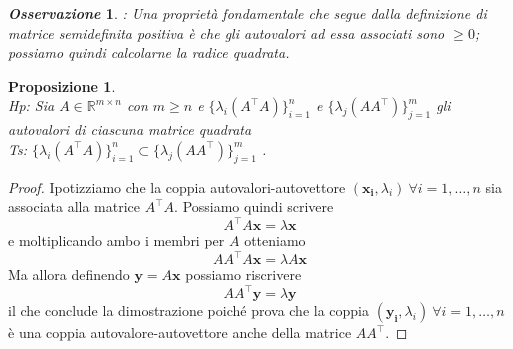 \documentclass[11pt]{article}
\newtheorem{proposition}{Proposizione}
\newtheorem{oss}{\textit{Osservazione}}
\newcommand{\R}{\mathbb{R}}
\begin{document}
\noindent
\begin{oss}: Una proprietà fondamentale che segue dalla definizione di matrice semidefinita positiva è che gli autovalori ad essa associati sono \(\geq 0\); possiamo quindi calcolarne la radice quadrata.
\end{oss}
\begin{proposition}\label{prop 2}
\textbf{}\\
\textit{Hp:} Sia $A \in \R^{m \times n}$ con $m \geq n$ e $\{\lambda_i(A^\top A)\}_{i=1}^{n}$ e $\{\lambda_j(A A^\top)\}_{j=1}^{m} $ gli autovalori di ciascuna matrice quadrata \\
\textit{Ts:} $ \{\lambda_i(A^\top A)\}_{i=1}^{n} \subset \{\lambda_j(A A^\top)\}_{j=1}^{m} $ .
\end{proposition}
\begin{proof}
Ipotizziamo che la coppia autovalori-autovettore $(\mathbf{x_i},\lambda_i) \ \forall i=1,\dots,n$ sia associata alla matrice $A^\top      A$. Possiamo quindi scrivere $$A^\top      A\mathbf{x}=\lambda\mathbf{x}$$ e moltiplicando ambo i membri per $A$ otteniamo$$AA^\top      A\mathbf{x}=\lambda A\mathbf{x}$$
Ma allora definendo $\mathbf{y}=A\mathbf{x}$ possiamo riscrivere $$AA^\top      \mathbf{y}=\lambda \mathbf{y}$$
il che conclude la dimostrazione poiché prova che la coppia $(\mathbf{y_i},\lambda_i) \ \forall i=1,\dots,n$ è una coppia autovalore-autovettore anche della matrice $AA^\top$. 
\end{proof}
\end{document}
